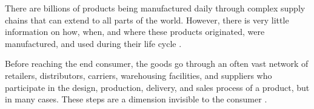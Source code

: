 There are billions of products being manufactured daily through complex supply chains that can extend to all parts of the world. However, there is very little information on how, when, and where these products originated, were manufactured, and used during their life cycle \cite{horiuchirastreabilidade}.

Before reaching the end consumer, the goods go through an often vast network of retailers, distributors, carriers, warehousing facilities, and suppliers who participate in the design, production, delivery, and sales process of a product, but in many cases. These steps are a dimension invisible to the consumer \cite{provenance2015}.